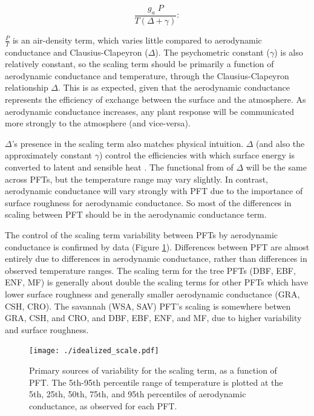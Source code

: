 \documentclass[draft,linenumbers]{agujournal}
\begin{document}
\begin{equation}
  \frac{g_a \; P}{T(\Delta + \gamma)}:
\end{equation}

$\frac{P}{T}$ is an air-density term, which varies little compared to aerodynamic conductance and Clausius-Clapeyron ($\Delta$). The psychometric constant ($\gamma$) is also relatively constant, so the scaling term should be primarily a function of aerodynamic conductance and temperature, through the Clausius-Clapeyron relationship $\Delta$. This is as expected, given that the aerodynamic conductance represents the efficiency of exchange between the surface and the atmosphere. As aerodynamic conductance  increases, any plant response will be communicated more strongly to the atmosphere (and vice-versa).

$\Delta$'s presence in the scaling term also matches physical intuition. $\Delta$ (and also the approximately constant $\gamma$) control the efficiencies with which surface energy is converted to latent and sensible heat \citep{Monteith_1965}. The functional from of $\Delta$ will be the same across PFTs, but the temperature range may vary slightly. In contrast, aerodynamic conductance will vary strongly with PFT due to the importance of surface roughness for aerodynamic conductance. So most of the differences in scaling between PFT should be in the aerodynamic conductance term. 

The control of the scaling term variability between PFTs by aerodynamic conductance is confirmed by data (Figure \ref{scale_vary}). Differences between PFT are almost entirely due to differences in aerodynamic conductance, rather than differences in observed temperature ranges. The scaling term for the tree PFTs (DBF, EBF, ENF, MF) is generally about double the scaling terms for other PFTs which have lower surface roughness and generally smaller aerodynamic conductance (GRA, CSH, CRO). The savannah (WSA, SAV) PFT's scaling is somewhere betwen GRA, CSH, and CRO, and DBF, EBF, ENF, and MF, due to higher variability and surface roughness. 

\begin{figure}
\centerline{\texttt{[image: ./idealized\_scale.pdf]}}
\caption{Primary sources of variability for the scaling term, as a function of PFT. The 5th-95th percentile range of temperature is plotted at the 5th, 25th, 50th, 75th, and 95th percentiles of aerodynamic conductance, as observed for each PFT.}
\label{scale_vary}
\end{figure}
\end{document}
